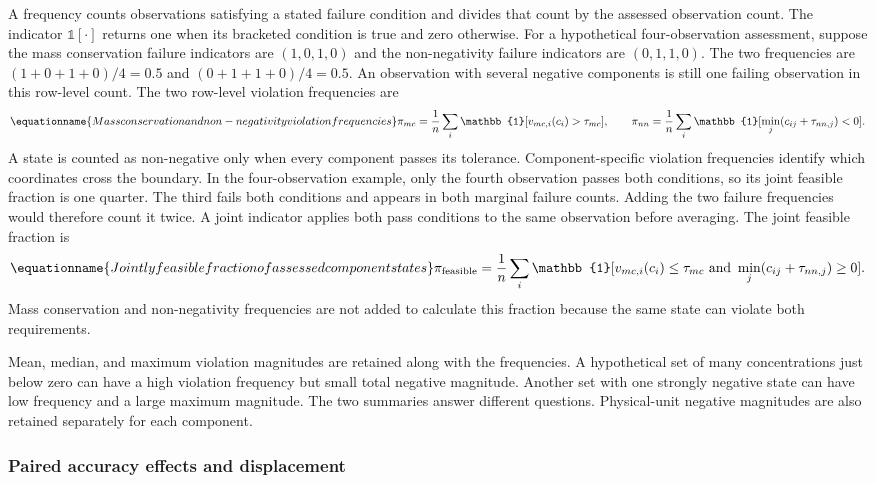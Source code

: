 A frequency counts observations satisfying a stated failure condition and divides that count by the assessed observation count. The indicator $\mathbb{1}[\cdot]$ returns one when its bracketed condition is true and zero otherwise. For a hypothetical four-observation assessment, suppose the mass conservation failure indicators are $(1,0,1,0)$ and the non-negativity failure indicators are $(0,1,1,0)$. The two frequencies are $(1+0+1+0)/4=0.5$ and $(0+1+1+0)/4=0.5$. An observation with several negative components is still one failing observation in this row-level count. The two row-level violation frequencies are
\begin{equation}
\equationname{Mass conservation and non-negativity violation frequencies}
\pi_{mc}=
\frac{1}{n}\sum_i\mathbb{1}[v_{mc,i}(c_i)>\tau_{mc}],\qquad
\pi_{nn}=
\frac{1}{n}\sum_i\mathbb{1}[\min_j(c_{ij}+\tau_{nn,j})<0].
\label{eq:projection_violation_rates}
\end{equation}
A state is counted as non-negative only when every component passes its tolerance. Component-specific violation frequencies identify which coordinates cross the boundary. In the four-observation example, only the fourth observation passes both conditions, so its joint feasible fraction is one quarter. The third fails both conditions and appears in both marginal failure counts. Adding the two failure frequencies would therefore count it twice. A joint indicator applies both pass conditions to the same observation before averaging. The joint feasible fraction is
\begin{equation}
\equationname{Jointly feasible fraction of assessed component states}
\pi_{\mathrm{feasible}}=
\frac{1}{n}\sum_i\mathbb{1}
[v_{mc,i}(c_i)\leq\tau_{mc}\ \text{and}\ 
\min_j(c_{ij}+\tau_{nn,j})\geq0].
\label{eq:projection_feasible_fraction}
\end{equation}
Mass conservation and non-negativity frequencies are not added to calculate this fraction because the same state can violate both requirements.

Mean, median, and maximum violation magnitudes are retained along with the frequencies. A hypothetical set of many concentrations just below zero can have a high violation frequency but small total negative magnitude. Another set with one strongly negative state can have low frequency and a large maximum magnitude. The two summaries answer different questions. Physical-unit negative magnitudes are also retained separately for each component.

\subsubsection{Paired accuracy effects and displacement}

